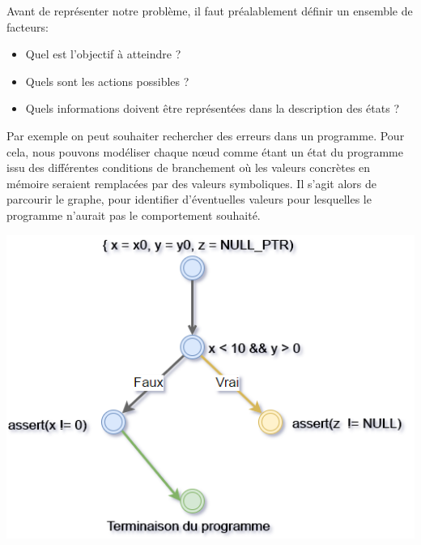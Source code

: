 Avant de représenter notre problème, il faut préalablement définir un ensemble de facteurs:
\begin{itemize}
\item Quel est l'objectif à atteindre ?
\item Quels sont les actions possibles ?
\item Quels informations doivent être représentées dans la description des états ?
\end{itemize}

Par exemple on peut souhaiter rechercher des erreurs dans un programme. Pour cela, nous pouvons modéliser chaque nœud comme étant un état du programme issu des différentes conditions de branchement où les valeurs concrètes en mémoire seraient remplacées par des valeurs symboliques. Il s'agit alors de parcourir le graphe, pour identifier d'éventuelles valeurs pour lesquelles le programme n'aurait pas le comportement souhaité.

\begin{center}
    \includegraphics[scale=0.6]{../ressources/images/state_space_graph.png}
\end{center}

